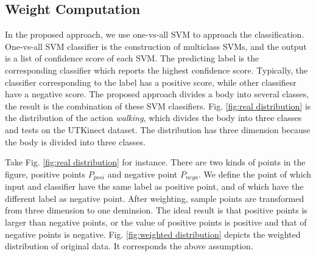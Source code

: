 \documentclass[conference]{IEEEtran}
\begin{document}
	\subsection{Weight Computation}
		In the proposed approach, we use one-vs-all SVM to approach the classification.
		One-vs-all SVM classifier is the construction of multiclass SVMs, and the output is a list of confidence score of each SVM.
		The predicting label is the corresponding classifier which reports the highest confidence score.
		Typically, the classifier corresponding to the label has a positive score, while other classifiesr have a negative score.
		The proposed approach divides a body into several classes, the result is the combination of these SVM classifiers.
		Fig. \ref{fig:real distribution} is the distribution of the action \textit{walking}, which divides the body into three classes and tests on the UTKinect dataset.
		The distribution has three dimension because the body is divided into three classes.
		
		Take Fig. \ref{fig:real distribution} for instance.
		There are two kinds of points in the figure, positive points $ P_{posi} $ and negative point $ P_{nega} $.
		We define the point of which input and classifier have the same label as positive point, and of which have the different label as negative point.
		After weighting, sample points are transformed from three dimension to one deminsion.
		The ideal result is that positive points is larger than negative points, or the value of positive points is positive and that of negative points is negative.
		Fig. \ref{fig:weighted distribution} depicts the weighted distribution of original data.
		It corresponds the above assumption.
		
\end{document}

